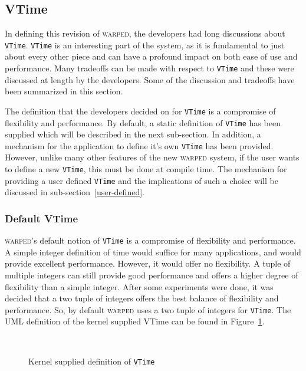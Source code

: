 \documentclass[11pt]{article}
\begin{document}
\subsection{VTime}\label{VTime}

In defining this revision of \textsc{warped}, the developers had long
discussions about {\tt VTime}.  {\tt VTime} is an interesting part of the
system, as it is fundamental to just about every other piece and can have
a profound impact on both ease of use and performance.  Many tradeoffs can
be made with respect to {\tt VTime} and these were discussed at length by
the developers.  Some of the discussion and tradeoffs have been summarized
in this section.

The definition that the developers decided on for {\tt VTime} is a
compromise of flexibility and performance.  By default, a static
definition of {\tt VTime} has been supplied which will be described in the
next sub-section.  In addition, a mechanism for the application to define
it's own {\tt VTime} has been provided.  However, unlike many other
features of the new \textsc{warped} system, if the user wants to define a
new {\tt VTime}, this must be done at compile time.  The mechanism for
providing a user defined {\tt VTime} and the implications of such a choice
will be discussed in sub-section~\ref{user-defined}.

\subsubsection{Default VTime}

\textsc{warped}'s default notion of {\tt VTime} is a compromise of
flexibility and performance.  A simple integer definition of time would
suffice for many applications, and would provide excellent performance.
However, it would offer no flexibility.  A tuple of multiple integers can
still provide good performance and offers a higher degree of flexibility
than a simple integer.  After some experiments were done, it was decided
that a two tuple of integers offers the best balance of flexibility and
performance.  So, by default \textsc{warped} uses a two tuple of integers
for {\tt VTime}.  The UML definition of the kernel supplied VTime can be
found in Figure~\ref{fig:kernel-vtime-uml}.

\begin{figure}[th]
\begin{center}
  \ 
\end{center}
\caption{Kernel supplied definition of {\tt VTime}}\label{fig:kernel-vtime-uml} 
\end{figure}
\end{document}
